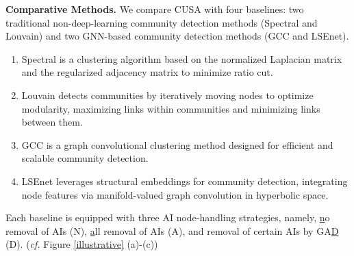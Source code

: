 \begingroup
\renewcommand{\arraystretch}{1}
\begin{table}[t]
\centering
\caption{The Q, HQ, HMR, and ADM results on the Cora dataset transformed into HASNs using the generation strategy (1), obtained by different AI node scoring methods used in CUSA, compared to no removal and all removal of AIs.}
\LARGE
{}
\label{AI node scoring methods}
\end{table}
\endgroup




\noindent\textbf{Comparative Methods.} We compare CUSA with four baselines: two traditional non-deep-learning community detection methods (Spectral and Louvain) and two GNN-based community detection methods (GCC and LSEnet).
\begin{enumerate}
    \renewcommand{\labelenumi}{(\theenumi)}
    \item Spectral \cite{amini2013pseudo} is a clustering algorithm based on the normalized Laplacian matrix and the regularized adjacency matrix to minimize ratio cut.
    \item Louvain \cite{blondel2008fast} detects communities by iteratively moving nodes to optimize modularity, maximizing links within communities and minimizing links between them.
    \item GCC \cite{fettal2022efficient} is a graph convolutional clustering method designed for efficient and scalable community detection.
    \item LSEnet \cite{sun2024lsenet} leverages structural embeddings for community detection, integrating node features via manifold-valued graph convolution in hyperbolic space.
    
\end{enumerate}
Each baseline is equipped with three AI node-handling strategies, namely, \underline{n}o removal of AIs (N), \underline{a}ll removal of AIs (A), and removal of certain AIs by GA\underline{D} (D). (\textit{cf.} Figure \ref{illustrative} (a)-(c))
\vspace{1em}

